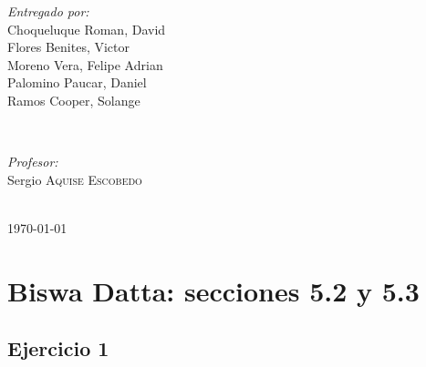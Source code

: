 \documentclass[12pt]{article}
\begin{document}
\begin{titlepage}
\begin{minipage}{0.4\textwidth}
\begin{flushleft} \large
\emph{Entregado por:}\\
Choqueluque Roman, David\\Flores Benites, Victor \\Moreno Vera, Felipe Adrian \\Palomino Paucar, Daniel \\Ramos Cooper, Solange \\%
\end{flushleft}
\end{minipage}
~
\begin{minipage}{0.4\textwidth}
\begin{flushright} \large
\emph{Profesor:} \\
Sergio \textsc{Aquise Escobedo} %
\end{flushright}
\end{minipage}\\[2cm]



{\large \today}\\[2cm] %

\vfill %

\end{titlepage}

\newpage

% 
\section{Biswa Datta: secciones 5.2 y 5.3}

\subsection{Ejercicio 1}
\end{document}
